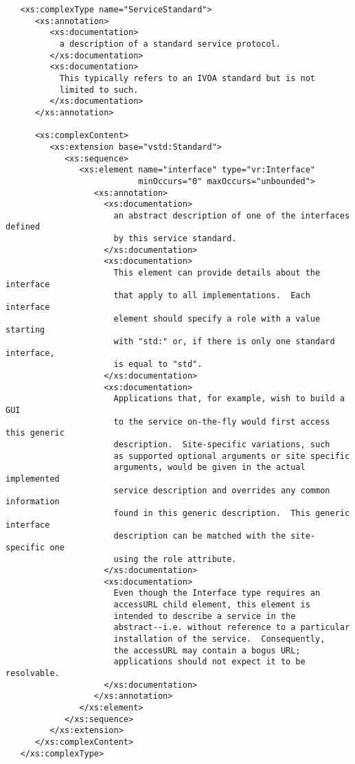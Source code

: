 \documentclass[11pt,a4paper]{ivoa}
\begin{document}
{{\begin{verbatim}
   <xs:complexType name="ServiceStandard">
      <xs:annotation>
         <xs:documentation>
           a description of a standard service protocol.
         </xs:documentation>
         <xs:documentation>
           This typically refers to an IVOA standard but is not
           limited to such.  
         </xs:documentation>
      </xs:annotation>

      <xs:complexContent>
         <xs:extension base="vstd:Standard">
            <xs:sequence>
               <xs:element name="interface" type="vr:Interface"
                           minOccurs="0" maxOccurs="unbounded">
                  <xs:annotation>
                    <xs:documentation>
                      an abstract description of one of the interfaces defined 
                      by this service standard.  
                    </xs:documentation>
                    <xs:documentation>
                      This element can provide details about the interface 
                      that apply to all implementations.  Each interface 
                      element should specify a role with a value starting 
                      with "std:" or, if there is only one standard interface,
                      is equal to "std".  
                    </xs:documentation>
                    <xs:documentation>
                      Applications that, for example, wish to build a GUI
                      to the service on-the-fly would first access this generic 
                      description.  Site-specific variations, such
                      as supported optional arguments or site specific 
                      arguments, would be given in the actual implemented 
                      service description and overrides any common information 
                      found in this generic description.  This generic interface
                      description can be matched with the site-specific one 
                      using the role attribute.  
                    </xs:documentation>
                    <xs:documentation>
                      Even though the Interface type requires an
                      accessURL child element, this element is
                      intended to describe a service in the
                      abstract--i.e. without reference to a particular 
                      installation of the service.  Consequently,
                      the accessURL may contain a bogus URL;
                      applications should not expect it to be resolvable.  
                    </xs:documentation>
                  </xs:annotation>
               </xs:element>
            </xs:sequence>
         </xs:extension>
      </xs:complexContent>
   </xs:complexType>


\end{verbatim}}}
\end{document}
